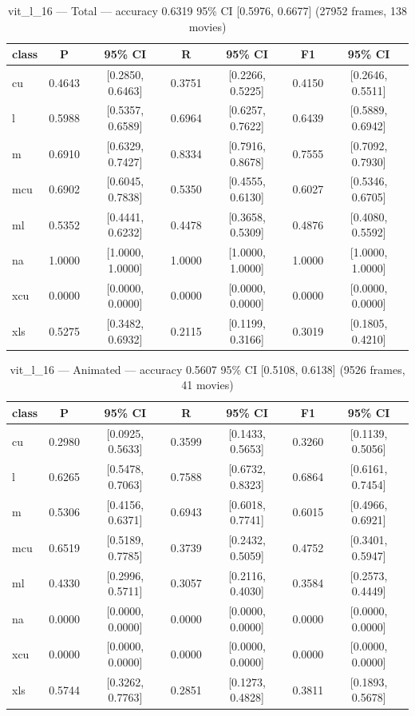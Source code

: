 \begin{table}[htbp]
\centering
\caption{vit\_l\_16 — Total — accuracy 0.6319 95\% CI [0.5976, 0.6677] (27952 frames, 138 movies)}
\label{tab:vit-l-16-total}
\begin{tabular}{lcccccc}
\toprule
class & P & 95\% CI & R & 95\% CI & F1 & 95\% CI \\
\midrule
cu & 0.4643 & [0.2850, 0.6463] & 0.3751 & [0.2266, 0.5225] & 0.4150 & [0.2646, 0.5511] \\
l & 0.5988 & [0.5357, 0.6589] & 0.6964 & [0.6257, 0.7622] & 0.6439 & [0.5889, 0.6942] \\
m & 0.6910 & [0.6329, 0.7427] & 0.8334 & [0.7916, 0.8678] & 0.7555 & [0.7092, 0.7930] \\
mcu & 0.6902 & [0.6045, 0.7838] & 0.5350 & [0.4555, 0.6130] & 0.6027 & [0.5346, 0.6705] \\
ml & 0.5352 & [0.4441, 0.6232] & 0.4478 & [0.3658, 0.5309] & 0.4876 & [0.4080, 0.5592] \\
na & 1.0000 & [1.0000, 1.0000] & 1.0000 & [1.0000, 1.0000] & 1.0000 & [1.0000, 1.0000] \\
xcu & 0.0000 & [0.0000, 0.0000] & 0.0000 & [0.0000, 0.0000] & 0.0000 & [0.0000, 0.0000] \\
xls & 0.5275 & [0.3482, 0.6932] & 0.2115 & [0.1199, 0.3166] & 0.3019 & [0.1805, 0.4210] \\
\bottomrule
\end{tabular}
\end{table}

\begin{table}[htbp]
\centering
\caption{vit\_l\_16 — Animated — accuracy 0.5607 95\% CI [0.5108, 0.6138] (9526 frames, 41 movies)}
\label{tab:vit-l-16-animated}
\begin{tabular}{lcccccc}
\toprule
class & P & 95\% CI & R & 95\% CI & F1 & 95\% CI \\
\midrule
cu & 0.2980 & [0.0925, 0.5633] & 0.3599 & [0.1433, 0.5653] & 0.3260 & [0.1139, 0.5056] \\
l & 0.6265 & [0.5478, 0.7063] & 0.7588 & [0.6732, 0.8323] & 0.6864 & [0.6161, 0.7454] \\
m & 0.5306 & [0.4156, 0.6371] & 0.6943 & [0.6018, 0.7741] & 0.6015 & [0.4966, 0.6921] \\
mcu & 0.6519 & [0.5189, 0.7785] & 0.3739 & [0.2432, 0.5059] & 0.4752 & [0.3401, 0.5947] \\
ml & 0.4330 & [0.2996, 0.5711] & 0.3057 & [0.2116, 0.4030] & 0.3584 & [0.2573, 0.4449] \\
na & 0.0000 & [0.0000, 0.0000] & 0.0000 & [0.0000, 0.0000] & 0.0000 & [0.0000, 0.0000] \\
xcu & 0.0000 & [0.0000, 0.0000] & 0.0000 & [0.0000, 0.0000] & 0.0000 & [0.0000, 0.0000] \\
xls & 0.5744 & [0.3262, 0.7763] & 0.2851 & [0.1273, 0.4828] & 0.3811 & [0.1893, 0.5678] \\
\bottomrule
\end{tabular}
\end{table}

